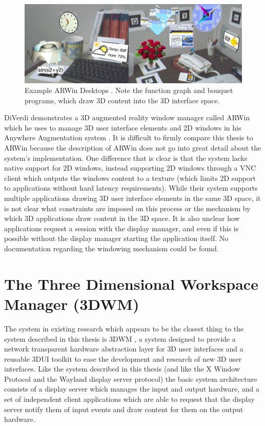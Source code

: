\begin{figure}[ht!]
\centering
\includegraphics[width=1.0\textwidth]{images/arwin.png}
\caption{Example ARWin Desktops \protect\cite{anywhere-augmentation}\protect\cite{arwin}. Note the function graph and bouquet programs, which draw 3D content into the 3D interface space.}
\end{figure}

DiVerdi demonstrates a 3D augmented reality window manager called ARWin \cite{arwin} which he uses to manage 3D user interface elements and 2D windows in his Anywhere Augmentation system \cite{anywhere-augmentation}. It is difficult to firmly compare this thesis to ARWin because the description of ARWin does not go into great detail about the system's implementation. One difference that is clear is that the system lacks native support for 2D windows, instead supporting 2D windows through a VNC client which outputs the windows content to a texture (which limits 2D support to applications without hard latency requirements). While their system supports multiple applications drawing 3D user interface elements in the same 3D space, it is not clear what constraints are imposed on this process or the mechanism by which 3D applications draw content in the 3D space. It is also unclear how applications request a session with the display manager, and even if this is possible without the display manager starting the application itself. No documentation regarding the windowing mechanism could be found. 

\section{The Three Dimensional Workspace Manager (3DWM)}

The system in existing research which appears to be the closest thing to the system described in this thesis is 3DWM \cite{3dwm}, a system designed to provide a network transparent hardware abstraction layer for 3D user interfaces and a reusable 3DUI toolkit to ease the development and research of new 3D user interfaces. Like the system described in this thesis (and like the X Window Protocol and the Wayland display server protocol) the basic system architecture consists of a display server which manages the input and output hardware, and a set of independent client applications which are able to request that the display server notify them of input events and draw content for them on the output hardware. 

